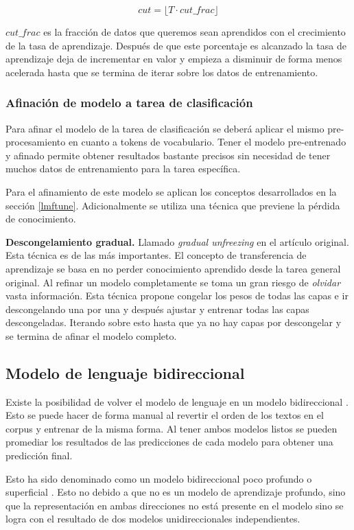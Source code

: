 $$ cut = \lfloor T \cdot cut\_frac \rfloor$$

$cut\_frac$ es la fracción de datos que queremos sean aprendidos con el crecimiento de la tasa de aprendizaje. Después de que este porcentaje es alcanzado la tasa de aprendizaje deja de incrementar en valor y empieza a disminuir de forma menos acelerada hasta que se termina de iterar sobre los datos de entrenamiento.

\subsubsection{Afinación de modelo a tarea de clasificación}

Para afinar el modelo de la tarea de clasificación se deberá aplicar el mismo pre-procesamiento en cuanto a tokens de vocabulario. Tener el modelo pre-entrenado y afinado permite obtener resultados bastante precisos sin necesidad de tener muchos datos de entrenamiento para la tarea específica.

Para el afinamiento de este modelo se aplican los conceptos desarrollados en la sección \ref{lmftune}. Adicionalmente se utiliza una técnica que previene la pérdida de conocimiento.

\textbf{Descongelamiento gradual.} Llamado \emph{gradual unfreezing} en el artículo original. Esta técnica es de las más importantes. El concepto de transferencia de aprendizaje se basa en no perder conocimiento aprendido desde la tarea general original. Al refinar un modelo completamente se toma un gran riesgo de \emph{olvidar} vasta información. Esta técnica propone congelar los pesos de todas las capas e ir descongelando una por una y después ajustar y entrenar todas las capas descongeladas. Iterando sobre esto hasta que ya no hay capas por descongelar y se termina de afinar el modelo completo.

\subsection{Modelo de lenguaje bidireccional}

Existe la posibilidad de volver el modelo de lenguaje en un modelo bidireccional \parencite{howard2018}. Esto se puede hacer de forma manual al revertir el orden de los textos en el corpus y entrenar de la misma forma. Al tener ambos modelos listos se pueden promediar los resultados de las predicciones de cada modelo para obtener una predicción final.

Esto ha sido denominado como un modelo bidireccional poco profundo o superficial \parencite{devlin2018bert}. Esto no debido a que no es un modelo de aprendizaje profundo, sino que la representación en ambas direcciones no está presente en el modelo sino se logra con el resultado de dos modelos unidireccionales independientes.
